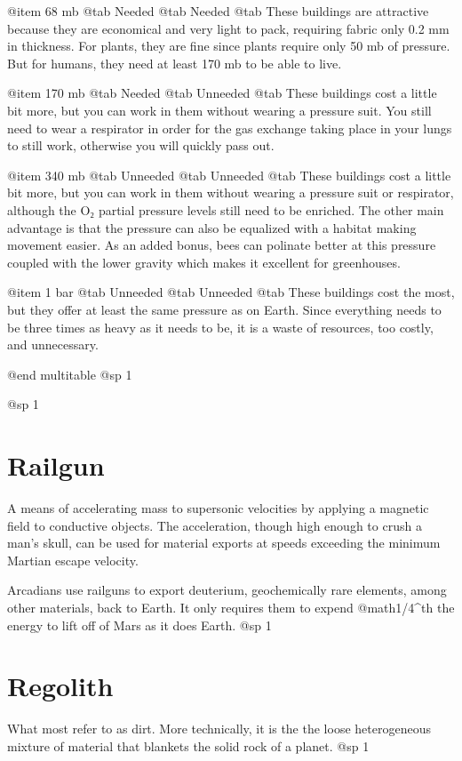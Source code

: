 @item 68 mb
@tab Needed
@tab Needed
@tab These buildings are attractive because they are economical and very light to pack, requiring fabric only 0.2 mm in thickness. For plants, they are fine since plants require only 50 mb of pressure. But for humans, they need at least 170 mb to be able to live.

@item 170 mb
@tab Needed
@tab Unneeded
@tab These buildings cost a little bit more, but you can work in them without wearing a pressure suit. You still need to wear a respirator in order for the gas exchange taking place in your lungs to still work, otherwise you will quickly pass out.

@item 340 mb
@tab Unneeded
@tab Unneeded
@tab These buildings cost a little bit more, but you can work in them without wearing a pressure suit or respirator, although the O₂ partial pressure levels still need to be enriched. The other main advantage is that the pressure can also be equalized with a habitat making movement easier. As an added bonus, bees can polinate better at this pressure coupled with the lower gravity which makes it excellent for greenhouses.

@item 1 bar
@tab Unneeded
@tab Unneeded
@tab These buildings cost the most, but they offer at least the same pressure as on Earth. Since everything needs to be three times as heavy as it needs to be, it is a waste of resources, too costly, and unnecessary.

@end multitable
@sp 1

@sp 1

\section{Railgun}
A means of accelerating mass to supersonic velocities by applying a magnetic field to conductive objects. The acceleration, though high enough to crush a man's skull, can be used for material exports at speeds exceeding the minimum Martian escape velocity.

Arcadians use railguns to export deuterium, geochemically rare elements, among other materials, back to Earth. It only requires them to expend @math{{1/4}^{th}} the energy to lift off of Mars as it does Earth.
@sp 1

\section{Regolith}
What most refer to as dirt. More technically, it is the the loose heterogeneous mixture of material that blankets the solid rock of a planet.
@sp 1

